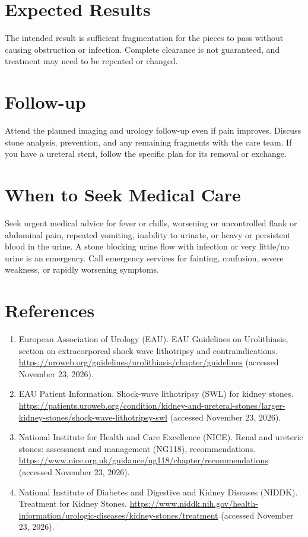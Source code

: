 \section*{Expected Results}
The intended result is sufficient fragmentation for the pieces to pass without causing obstruction or infection. Complete clearance is not guaranteed, and treatment may need to be repeated or changed.

\section*{Follow-up}
Attend the planned imaging and urology follow-up even if pain improves. Discuss stone analysis, prevention, and any remaining fragments with the care team. If you have a ureteral stent, follow the specific plan for its removal or exchange.

\section*{When to Seek Medical Care}
Seek urgent medical advice for fever or chills, worsening or uncontrolled flank or abdominal pain, repeated vomiting, inability to urinate, or heavy or persistent blood in the urine. A stone blocking urine flow with infection or very little/no urine is an emergency. Call emergency services for fainting, confusion, severe weakness, or rapidly worsening symptoms.

\section*{References}
\begin{enumerate}
  \item European Association of Urology (EAU). EAU Guidelines on Urolithiasis, section on extracorporeal shock wave lithotripsy and contraindications. \url{https://uroweb.org/guidelines/urolithiasis/chapter/guidelines} (accessed November 23, 2026).
  \item EAU Patient Information. Shock-wave lithotripsy (SWL) for kidney stones. \url{https://patients.uroweb.org/condition/kidney-and-ureteral-stones/larger-kidney-stones/shock-wave-lithotripsy-swl} (accessed November 23, 2026).
  \item National Institute for Health and Care Excellence (NICE). Renal and ureteric stones: assessment and management (NG118), recommendations. \url{https://www.nice.org.uk/guidance/ng118/chapter/recommendations} (accessed November 23, 2026).
  \item National Institute of Diabetes and Digestive and Kidney Diseases (NIDDK). Treatment for Kidney Stones. \url{https://www.niddk.nih.gov/health-information/urologic-diseases/kidney-stones/treatment} (accessed November 23, 2026).
\end{enumerate}

\clearpage
